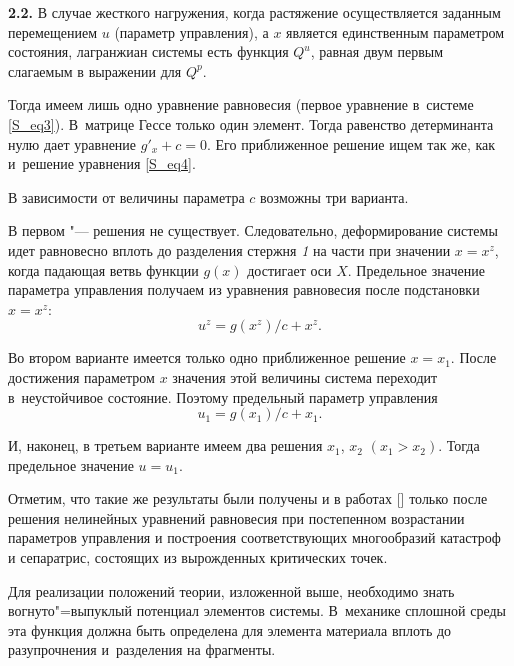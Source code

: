 \smallskip

{\bf 2.2.}
В случае жесткого нагружения, когда растяжение осуществляется заданным перемещением $ u $ (параметр управления), а $ x $ является единственным параметром состояния, лагранжиан системы есть функция $ Q^u $, равная двум первым слагаемым в выражении для $ Q^p $. 

Тогда имеем лишь одно уравнение равновесия (первое уравнение в~системе \eqref{S_eq3}). 
В~матрице Гессе только один элемент. 
Тогда равенство детерминанта нулю дает уравнение $ g'_{x} + c = 0 $. 
Его приближенное решение ищем так же, как и~решение уравнения \eqref{S_eq4}. 

В зависимости от величины параметра $ c $ возможны три варианта. 

В первом "--- решения не существует. Следовательно, деформирование системы идет равновесно вплоть до разделения стержня {\sl 1} на части при значении $ x = x^z $, когда падающая ветвь функции $ g(x) $ достигает оси $ X $. Предельное значение параметра управления получаем из уравнения равновесия после подстановки $ x = x^z $: 
$$ u^z = g(x^z)/c+ x^z.$$ 

Во втором варианте имеется только одно приближенное решение $ x =  x_1 $. 
После достижения параметром $ x $ значения этой величины система переходит в~неустойчивое состояние. 
Поэтому предельный параметр управления $$ u_1 = g(x_1)/c + x_1 .$$ 

И, наконец, в третьем варианте имеем два решения $ x_1$, $x_2$  $(x_1 > x_2) $. 
Тогда предельное значение  $ u = u_1 $.

Отметим, что такие же результаты были получены и в работах [] только после решения нелинейных уравнений равновесия при постепенном возрастании параметров управления и построения соответствующих многообразий катастроф и сепаратрис, состоящих из вырожденных критических точек.

\smallskip

Для реализации положений теории, изложенной выше, необходимо знать вогнуто"=выпуклый потенциал элементов системы. 
В~механике сплошной среды эта функция должна быть определена для элемента материала вплоть до разупрочнения и~разделения на фрагменты.

